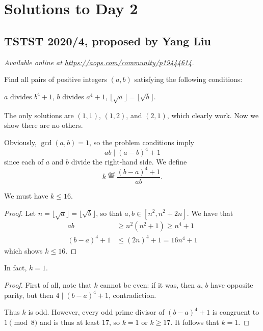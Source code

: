 \documentclass[11pt]{scrartcl}
\begin{document}
\section{Solutions to Day 2}
\subsection{TSTST 2020/4, proposed by Yang Liu}
\textsl{Available online at \url{https://aops.com/community/p19444614}.}
\begin{mdframed}[style=mdpurplebox,frametitle={Problem statement}]
Find all pairs of positive integers $(a, b)$ satisfying
the following conditions:
\begin{enumerate}[(i)]
  \ii $a$ divides $b^4+1$,
  \ii $b$ divides $a^4+1$,
  \ii $\lfloor \sqrt{a} \rfloor = \lfloor \sqrt{b} \rfloor$.
\end{enumerate}
\end{mdframed}
The only solutions are $(1, 1)$, $(1, 2)$, and $(2, 1)$,
which clearly work. Now we show there are no others.

Obviously, $\gcd(a,b) = 1$, so the problem conditions imply
\[ ab \mid (a-b)^4+1 \]
since each of $a$ and $b$ divide the right-hand side.
We define
\[ k \stackrel{\text{def}}{=} \frac{(b-a)^4 + 1}{ab}. \]

\begin{claim*}
  We must have $k \le 16$.
\end{claim*}
\begin{proof}
  Let $n = \lfloor \sqrt{a} \rfloor = \lfloor \sqrt{b} \rfloor$,
  so that $a,b \in [n^2, n^2+2n]$.
  We have that
  \begin{align*}
    ab &\ge n^2(n^2 + 1) \ge n^4 + 1 \\
    (b-a)^4+1 &\le (2n)^4+1 = 16n^4+1
  \end{align*}
  which shows $k \le 16$.
\end{proof}

\begin{claim*}
  In fact, $k = 1$.
\end{claim*}

\begin{proof}
  First of all, note that $k$ cannot be even:
  if it was, then $a$, $b$ have opposite parity,
  but then $4 \mid (b-a)^4 + 1$, contradiction.

  Thus $k$ is odd. However, every odd prime divisor of $(b-a)^4 + 1$
  is congruent to $1 \pmod{8}$ and is thus at least $17$,
  so $k = 1$ or $k \ge 17$.
  It follows that $k = 1$.
\end{proof}
\end{document}

